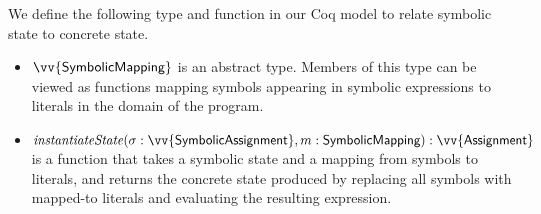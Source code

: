 We define the following type and function in our Coq model to relate symbolic
state to concrete state. 

\begin{itemize}
\item $\vv{\textsf{SymbolicMapping}}$ is an abstract type. Members of this type
  can be viewed as functions mapping symbols appearing in symbolic expressions to literals
  in the domain of the program.
\item $\mathit{instantiateState}(\sigma: \vv{\textsf{SymbolicAssignment}},
    m: \textsf{SymbolicMapping}) : \vv{\textsf{Assignment}}$ is a function that takes a symbolic state and a mapping from symbols to literals, and
returns the concrete state produced by replacing all symbols with mapped-to
literals and evaluating the resulting expression.
\end{itemize}



